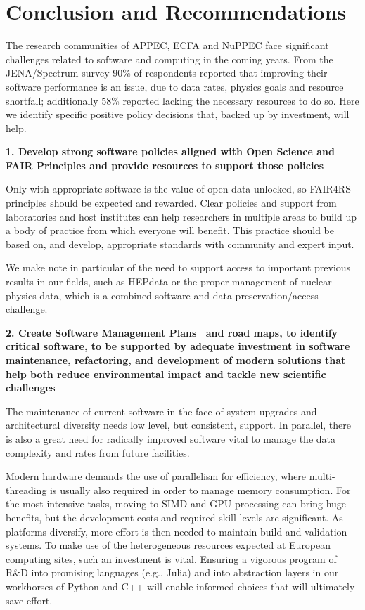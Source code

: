 \section{Conclusion and Recommendations}

The research communities of APPEC, ECFA and NuPPEC face significant challenges related to software and computing in the coming years. From the JENA/Spectrum survey 90\% of respondents reported that improving their software performance is an issue, due to data rates, physics goals and resource shortfall; additionally 58\% reported lacking the necessary resources to do so. Here we identify specific positive policy decisions that, backed up by investment, will help.

{\bf 1. Develop strong software policies aligned with Open Science and FAIR Principles and provide resources to support those policies}

Only with appropriate software is the value of open data unlocked, so FAIR4RS principles should be expected and rewarded. Clear policies and support from laboratories and host institutes can help researchers in multiple areas to build up a body of practice from which everyone will benefit. This practice should be based on, and develop, appropriate standards with community and expert input.

We make note in particular of the need to support access to important previous results in our fields, such as HEPdata or the proper management of nuclear physics data, which is a combined software and data preservation/access challenge.

{\bf 2. Create Software Management Plans~\cite{SMPs} and road maps, to identify critical software, to be supported by adequate investment in software maintenance, refactoring, and development of modern solutions that help both reduce environmental impact and tackle new scientific challenges}

The maintenance of current software in the face of system upgrades and architectural diversity needs low level, but consistent, support. In parallel, there is also a great need for radically improved software vital to manage the data complexity and rates from future facilities.

Modern hardware demands the use of parallelism for efficiency, where multi-threading is usually also required in order to manage memory consumption. For the most intensive tasks, moving to SIMD and GPU processing can bring huge benefits, but the development costs and required skill levels are significant. As platforms diversify, more effort is then needed to maintain build and validation systems. To make use of the heterogeneous resources expected at European computing sites, such an investment is vital. Ensuring a vigorous program of R\&D into promising languages (e.g., Julia) and into abstraction layers in our workhorses of Python and C++ will enable informed choices that will ultimately save effort.

